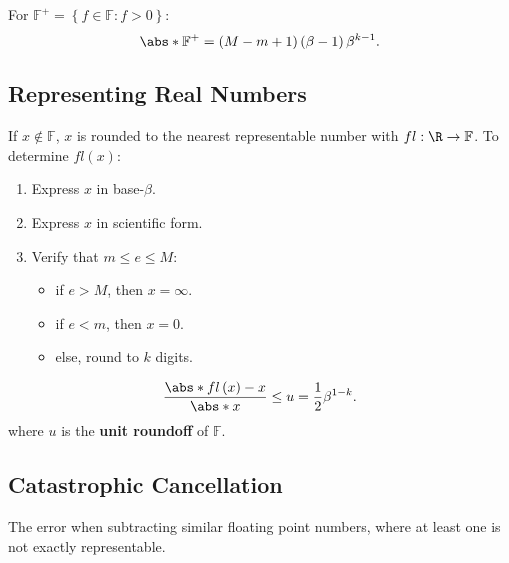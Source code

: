 \documentclass{article}
\begin{document}
\begin{multicols}{3}
    For \(\mathbb{F}^+ = \left\{ f \in \mathbb{F} : f > 0 \right\}\):
    \begin{equation*}
        \abs*{\mathbb{F}^+} = \left( M - m + 1 \right) \left( \beta - 1 \right) \beta^{k - 1}.
    \end{equation*}
    \subsection{Representing Real Numbers}
    If \(x \notin \mathbb{F}\), \(x\) is rounded to the nearest representable number
    with \(fl : \R \to \mathbb{F}\). To determine \(fl\left( x \right)\):
    \begin{enumerate}
        \item Express \(x\) in base-\(\beta\).
        \item Express \(x\) in scientific form.
        \item Verify that \(m \leq e \leq M\):
              \begin{itemize}
                  \item if \(e > M\), then \(x = \infty\).
                  \item if \(e < m\), then \(x = 0\).
                  \item else, round to \(k\) digits.
              \end{itemize}
    \end{enumerate}
    \begin{equation*}
        \frac{\abs*{fl\left( x \right) - x}}{\abs*{x}} \leq u = \frac{1}{2} \beta^{1 - k}.
    \end{equation*}
    where \(u\) is the \textbf{unit roundoff}  of \(\mathbb{F}\).
    \subsection{Catastrophic Cancellation}
    The error when subtracting similar floating
    point numbers, where at least one is not exactly representable.

\end{multicols}
\end{document}
